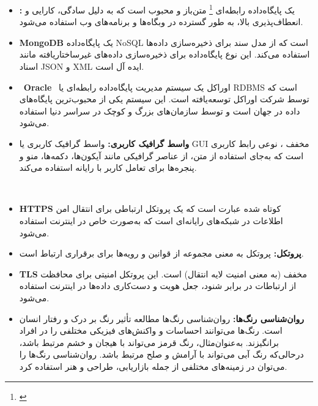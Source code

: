 \documentclass[12pt,a4paper,oneside]{article}
\begin{document}
\begin{itemize}
					    \item 
					   \textbf{:\label{ref:mysql}}
					   یک 
					   پایگاه‌داده رابطه‌ای
					   \footnote{\label{ref:rd}}
					    متن‌باز و محبوب است که به دلیل سادگی، کارایی و انعطاف‌پذیری بالا، به طور گسترده در وبگاه‌ها و برنامه‌های وب استفاده می‌شود.
					    
					    \item 
					   \textbf{MongoDB\rl{:}\label{ref:mongo}}
					   یک پایگاه‌داده NoSQL است که از مدل سند برای ذخیره‌سازی داده‌ها استفاده می‌کند. این نوع پایگاه‌داده برای ذخیره‌سازی داده‌های غیرساختاریافته مانند اسناد JSON و XML ایده آل است.
					   
					   \item 
					    \textbf{Oracle\rl{:}\label{ref:oracle}}
					    اوراکل یک سیستم مدیریت پایگاه‌داده رابطه‌ای یا RDBMS است که توسط شرکت اوراکل توسعه‌یافته است. این سیستم یکی از محبوب‌ترین پایگاه‌های داده در جهان است و توسط سازمان‌های بزرگ و کوچک در سراسر دنیا استفاده می‌شود.

					   \item
					   \textbf{واسط گرافیک کاربری:\label{ref:gui}}
					    واسط گرافیک کاربری یا GUI مخفف
					    ، نوعی رابط کاربری است که به‌جای استفاده از متن، از عناصر گرافیکی مانند آیکون‌ها، دکمه‌ها، منو و پنجره‌ها برای تعامل کاربر با رایانه استفاده می‌کند.

						 \item 
						\textbf{HTTPS\label{ref:https}}
						 کوتاه شده عبارت 
						  است که یک پروتکل ارتباطی برای انتقال امن اطلاعات در شبکه‌های رایانه‌ای است که به‌صورت خاص در اینترنت استفاده می‌شود.
						  
						\item 
						\textbf{پروتکل:\label{ref:protocol}}
						 پروتکل به معنی مجموعه از قوانین و رویه‌ها برای برقراری ارتباط است.
						 
						\item 
						\textbf{TLS\label{ref:tls}}
						 مخفف 
						  (به معنی امنیت لایه انتقال) است. این پروتکل امنیتی برای محافظت از ارتباطات در برابر شنود، جعل هویت و دست‌کاری داده‌ها در اینترنت استفاده می‌شود.
	  
						  \item
						  \textbf{روان‌شناسی رنگ‌ها:\label{ref:colorpsychology}}
						   روان‌شناسی رنگ‌ها مطالعه تأثیر رنگ بر درک و رفتار انسان است. رنگ‌ها می‌توانند احساسات و واکنش‌های فیزیکی مختلفی را در افراد برانگیزند. به‌عنوان‌مثال، رنگ قرمز می‌تواند با هیجان و خشم مرتبط باشد، درحالی‌که رنگ آبی می‌تواند با آرامش و صلح مرتبط باشد. روان‌شناسی رنگ‌ها را می‌توان در زمینه‌های مختلفی از جمله بازاریابی، طراحی و هنر استفاده کرد.
						  

\end{itemize}
\end{document}
